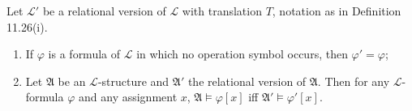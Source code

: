 Let $\mathcal{L}'$ be a relational version of $\mathcal{L}$ with translation $T$, notation as in Definition 11.26(i).

\begin{enumerate}
\item[(i)] If $\varphi$ is a formula of $\mathcal{L}$ in which no operation symbol occurs, then $\varphi' = \varphi$;
\item[(ii)] Let $\mathfrak{A}$ be an $\mathcal{L}$-structure and $\mathfrak{A}'$ the relational version of $\mathfrak{A}$. Then for any $\mathcal{L}$-formula $\varphi$ and any assignment $x$, $\mathfrak{A} \models \varphi[x]$ iff $\mathfrak{A}' \models \varphi'[x]$.
\end{enumerate}
